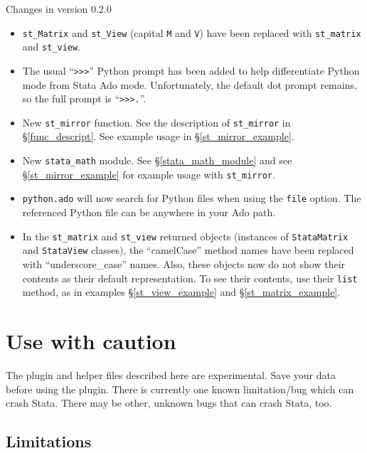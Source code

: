 \documentclass{article}
\begin{document}
Changes in version 0.2.0
\begin{itemize}
\item \lstinline{st_Matrix} and \lstinline{st_View} (capital \lstinline{M} and \lstinline{V}) have been replaced with \lstinline{st_matrix} and \lstinline{st_view}.
\item The usual ``\lstinline{>>>}'' Python prompt has been added to help differentiate Python mode from Stata Ado mode. Unfortunately, the default dot prompt remains, so the full prompt is ``\lstinline{>>>.}''.
\item New \lstinline{st_mirror} function. See the description of \lstinline{st_mirror} in \S\ref{func_descript}. See example usage in \S\ref{st_mirror_example}.
\item New \lstinline{stata_math} module. See \S\ref{stata_math_module} and see \S\ref{st_mirror_example} for example usage with \lstinline{st_mirror}.
\item \lstinline{python.ado} will now search for Python files when using the \lstinline{file} option. The referenced Python file can be anywhere in your Ado path.
\item In the \lstinline{st_matrix} and \lstinline{st_view} returned objects (instances of \lstinline{StataMatrix} and \lstinline{StataView} classes), the ``camelCase'' method names have been replaced with ``underscore\_case'' names. Also, these objects now do not show their contents as their default representation. To see their contents, use their \lstinline{list} method, as in examples \S\ref{st_view_example} and \S\ref{st_matrix_example}.
\end{itemize}
				


\section{Use with caution}
	
The plugin and helper files described here are experimental. Save your data before using the plugin. There is currently one known limitation/bug which can crash Stata. There may be other, unknown bugs that can crash Stata, too.
	
\subsection{Limitations} \label{limitations}
	
\end{document}
